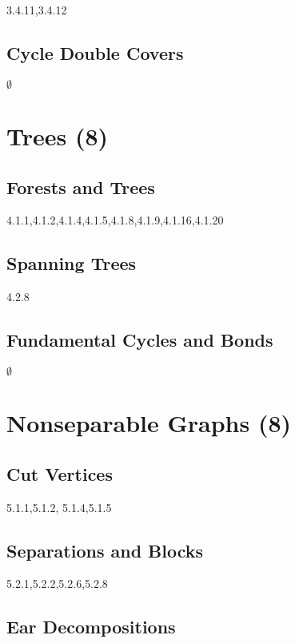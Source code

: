 \documentclass[12pt]{article}
\begin{document}
3.4.11,3.4.12

\subsection{Cycle Double Covers}

$\emptyset$

\newpage

\section{Trees (8)}

\subsection{Forests and Trees}

4.1.1,4.1.2,4.1.4,4.1.5,4.1.8,4.1.9,4.1.16,4.1.20

\subsection{Spanning Trees}

4.2.8

\subsection{Fundamental Cycles and Bonds}

$\emptyset$

\newpage


\section{Nonseparable Graphs (8)}

\subsection{Cut Vertices}

5.1.1,5.1.2, 5.1.4,5.1.5


\subsection{Separations and Blocks}

5.2.1,5.2.2,5.2.6,5.2.8

\subsection{Ear Decompositions}
\end{document}
